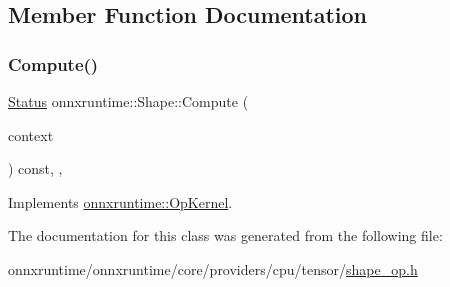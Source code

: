 \subsection{Member Function Documentation}
\mbox{\label{classonnxruntime_1_1Shape_a95830d9c4577aba0591a74dbfe538498}} 
\subsubsection{\texorpdfstring{Compute()}{Compute()}}
{\footnotesize\ttfamily \mbox{\hyperlink{classonnxruntime_1_1common_1_1Status}{Status}} onnxruntime\+::\+Shape\+::\+Compute (\begin{DoxyParamCaption}\item[{\mbox{\hyperlink{classonnxruntime_1_1OpKernelContext}{Op\+Kernel\+Context}} $\ast$}]{context }\end{DoxyParamCaption}) const\hspace{0.3cm}{\ttfamily [inline]}, {\ttfamily [override]}, {\ttfamily [virtual]}}



Implements \mbox{\hyperlink{classonnxruntime_1_1OpKernel_a9eca8656a78b1b3ab9d3351a12798650}{onnxruntime\+::\+Op\+Kernel}}.



The documentation for this class was generated from the following file\+:\begin{DoxyCompactItemize}
\item 
onnxruntime/onnxruntime/core/providers/cpu/tensor/\mbox{\hyperlink{shape__op_8h}{shape\+\_\+op.\+h}}\end{DoxyCompactItemize}
